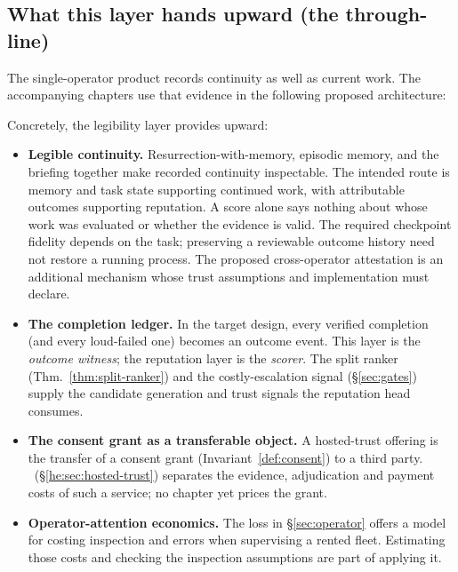 \documentclass[11pt,a4paper]{article}
\theoremstyle{definition}
\theoremstyle{plain}
\begin{document}
\subsection{What this layer hands upward (the through-line)}\label{sec:handoff}

The single-operator product records continuity as well as current work. The
accompanying chapters use that evidence in the following proposed architecture:


Concretely, the legibility layer provides upward:
\begin{itemize}[leftmargin=1.2em]
\item \textbf{Legible continuity.} Resurrection-with-memory, episodic memory, and
the briefing together make recorded continuity inspectable. The intended route
is memory and task state supporting continued work, with attributable outcomes
supporting reputation. A score alone says nothing about whose work was evaluated
or whether the evidence is valid. The required checkpoint fidelity depends on
the task; preserving a reviewable outcome history need not restore a running
process. The proposed cross-operator attestation is an additional mechanism
whose trust assumptions and implementation 
must declare.
\item \textbf{The completion ledger.} In the target design, every verified
completion (and every loud-failed one) becomes an outcome event. This layer is the \emph{outcome witness}; the
reputation layer is the \emph{scorer}. The split ranker
(Thm.~\ref{thm:split-ranker}) and the costly-escalation signal (\S\ref{sec:gates})
supply the candidate generation and trust signals the reputation head consumes.
\item \textbf{The consent grant as a transferable object.} A hosted-trust offering is
the transfer of a consent grant (Invariant~\ref{def:consent}) to a third party.
%
\ifpdbook
\ (\S\ref{he:sec:hosted-trust})%
\fi
{} separates the evidence, adjudication and payment costs of such a service; no
chapter yet prices the grant.
\item \textbf{Operator-attention economics.} The loss in
\S\ref{sec:operator} offers a model for costing inspection and errors when
supervising a rented fleet. Estimating those costs and checking the inspection
assumptions are part of applying it.
\end{itemize}
\end{document}
